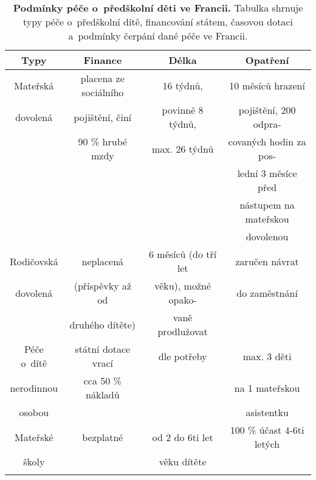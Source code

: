 		\begin{spacing}{1.0}
		\begin{table}[ht]
			\center
			\small
			\begin{center}
			\begin{tabular}{|c|c|c|c|}
				\hline
				\rowcolor{grey}		
				\textbf{Typy}	&	\textbf{Finance} & 	\textbf{Délka} 	&	\textbf{Opatření} 	\\
				\hline
				\hline
				\rowcolor{grey!10}
				Mateřská	&  placena ze sociálního &  16 týdnů, 		 & 10 měsíců hrazení 		\\ \rowcolor{grey!10}
				dovolená 	& 	 pojištění, činí  	 & 	povinně 8 týdnů, & pojištění, 200 odpra- 	\\ \rowcolor{grey!10}
				 			& 	90 \% hrubé mzdy 	 &  max. 26 týdnů 	 & covaných hodin za pos- 	\\ \rowcolor{grey!10}
				 			&						 & 					 & lední 3 měsíce před 		\\ \rowcolor{grey!10}
				 			&						 &					 & nástupem na mateřskou 	\\ \rowcolor{grey!10}
				 			&						 & 					 & dovolenou 				\\ \rowcolor{grey!10}
				\hline
				Rodičovská	& neplacená & 6 měsíců (do tří let 		& 	zaručen návrat 	\\ \rowcolor{grey!10}
				dovolená & (příspěvky až od & věku), možné opako-  	&  do zaměstnání	\\ \rowcolor{grey!10}
						 & druhého dítěte)  & vaně prodlužovat						&	\\ \rowcolor{grey!10}
				 \hline
				Péče o~dítě	&	státní dotace vrací	&	dle potřeby	& max. 3 děti \\ \rowcolor{grey!10}
				nerodinnou 	&	cca 50 \% nákladů 	&	& na 1 mateřskou 	\\ \rowcolor{grey!10}
				osobou 		& 						&	& asistentku		\\ \rowcolor{grey!10}
				\hline
				Mateřské 	&	bezplatné	& od 2 do 6ti let	& 100 \% účast 4-6ti letých \\ \rowcolor{grey!10}
				školy 		& 	 			& věku dítěte	& 						\\ \rowcolor{grey!10}
				\hline
			\end{tabular}
			\end{center}
			\caption{
				\textbf{Podmínky péče o~předškolní děti ve Francii.}
				Tabulka shrnuje typy péče o~předškolní dítě, financování státem, časovou dotaci a~podmínky čerpání dané péče ve Francii.
				\label{tab:peceFR}
							}
		\end{table}
		\end{spacing}

